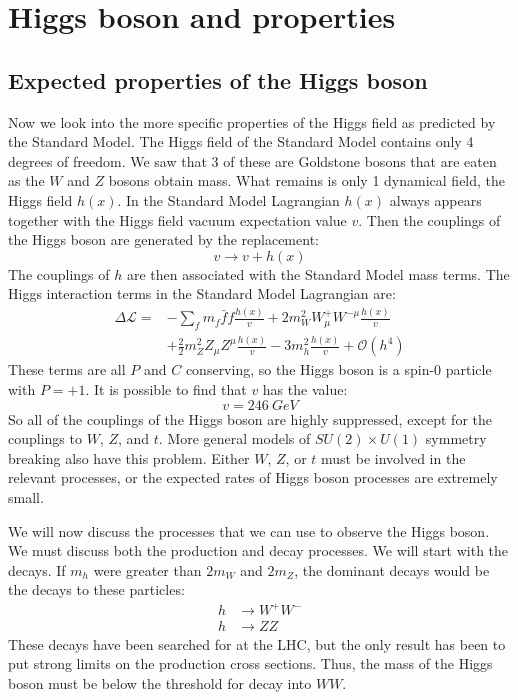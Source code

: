 \documentclass[../../main/main.tex]{subfiles}
\begin{document}

\section{Higgs boson and properties}

\subsection{Expected properties of the Higgs boson}
Now we look into the more specific properties of the Higgs field as predicted by the Standard Model. The Higgs field of the Standard Model contains only 4 degrees of freedom. We saw that 3 of these are Goldstone bosons that are eaten as the \( W \) and \( Z \) bosons obtain mass. What remains is only 1 dynamical field, the Higgs field \( h(x) \). In the Standard Model Lagrangian \( h(x) \) always appears together with the Higgs field vacuum expectation value \( v \). Then the couplings of the Higgs boson are generated by the replacement:
\begin{equation}
	v
	\longrightarrow
	v + h(x)
	\label{eq:}
\end{equation}
The couplings of \( h \) are then associated with the Standard Model mass terms. The Higgs interaction terms in the Standard Model Lagrangian are:
\begin{align}
	\Delta \mathcal{L}
	=&
		- \sum_{f} m_f \bar{f} f \frac{h(x)}{v} + 2 m^2_W W^{+}_{\mu} W^{- \mu} \frac{h(x)}{v} \nonumber \\
		&+ \frac{2}{2} m^2_Z Z_{\mu} Z^{\mu} \frac{h(x)}{v} - 3m^2_h \frac{h(x)}{v} + \mathcal{O}(h^4)
\end{align}
These terms are all \( P \) and \( C \) conserving, so the Higgs boson is a spin-0 particle with \( P = +1 \). It is possible to find that \( v \) has the value:
\begin{equation}
	v
	=
	246 \ \si{GeV}
	\label{eq:}
\end{equation}
So all of the couplings of the Higgs boson are highly suppressed, except for the couplings to \( W \), \( Z \), and \( t \). More general models of \( SU(2) \times U(1) \) symmetry breaking also have this problem. Either \( W \), \( Z \), or \( t \) must be involved in the relevant processes, or the expected rates of Higgs boson processes are extremely small.

We will now discuss the processes that we can use to observe the Higgs boson. We must discuss both the production and decay processes. We will start with the decays. If \( m_h \) were greater than \( 2 m_W \) and \( 2 m_Z \), the dominant decays would be the decays to these particles:
\begin{align}
	h &\longrightarrow W^+W^-	\\
	h &\longrightarrow ZZ
\end{align}
These decays have been searched for at the LHC, but the only result has been to put strong limits on the production cross sections. Thus, the mass of the Higgs boson must be below the threshold for decay into \( WW \).
\end{document}
